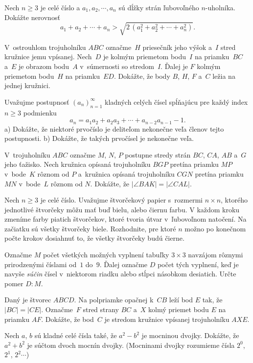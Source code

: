 {%
Nech $n\ge3$ je celé číslo a $a_1, a_2, \cdots, a_n$ sú dĺžky strán ľubovoľného $n$-uholníka. Dokážte nerovnosť
$$a_1 + a_2 + \cdots + a_n > \sqrt{2\,(a_1^2+a_2^2+\cdots+a_n^2)}.$$}

{%
V~ostrouhlom trojuholníku $ABC$ označme~$H$ priesečník jeho výšok a~$I$ stred kružnice jemu vpísanej. Nech~$D$ je kolmým priemetom bodu~$I$ na priamku~$BC$ a~$E$ je obrazom bodu~$A$ v~súmernosti so stredom~$I$. Ďalej je $F$ kolmým priemetom bodu~$H$ na priamku~$ED$. Dokážte, že body $B$, $H$, $F$ a~$C$ ležia na jednej kružnici.}

{%
Uvažujme postupnosť $(a_n)_{n=1}^\infty$ kladných celých čísel spĺňajúcu pre každý index $n\ge 3$ podmienku
$$
a_n=a_1a_2+a_2a_3+\cdots + a_{n-2}a_{n-1} - 1.
$$
\ite a) Dokážte, že niektoré prvočíslo je deliteľom nekonečne veľa členov tejto postupnosti.
\ite b) Dokážte, že takých prvočísel je nekonečne veľa.
}

{%
V~trojuholníku $ABC$ označme $M$, $N$, $P$ postupne stredy strán $BC$, $CA$, $AB$ a~$G$ jeho ťažisko. Nech kružnica opísaná trojuholníku $BGP$ pretína priamku $MP$ v~bode~$K$ rôznom od $P$ a~kružnica opísaná trojuholníku $CGN$ pretína priamku $MN$ v~bode~$L$ rôznom od $N$. Dokážte, že $|\angle BAK| = |\angle CAL|$.}

{%
Nech $n \geq 3$ je celé číslo. Uvažujme štvorčekový papier s~rozmermi $n \times n$, ktorého jednotlivé štvorčeky môžu mať buď bielu, alebo čiernu farbu. V každom kroku zmeníme farby piatich štvorčekov, ktoré tvoria útvar
v~ľubovoľnom natočení. Na začiatku sú všetky štvorčeky biele. Rozhodnite, pre ktoré $n$ možno po konečnom počte krokov dosiahnuť to, že všetky štvorčeky budú čierne.}

{%
Označme $M$ počet všetkých možných vyplnení tabuľky $3 \times 3$
navzájom rôznymi prirodzenými číslami od~$1$ do~$9$.
Ďalej označme $D$ počet tých vyplnení, keď je navyše \emph{súčin} čísel v~niektorom riadku alebo stĺpci násobkom desiatich.
Určte pomer $D : M$.}

{%
Daný je štvorec $ABCD$. Na polpriamke opačnej k~$CB$ leží bod $E$ tak, že $|BC|=|CE|$. Označme~$F$ stred strany $BC$ a~$X$ kolmý priemet bodu $E$ na priamku $AF$. Dokážte, že bod~$C$ je stredom kružnice vpísanej trojuholníku $AXE$.}

{%
Nech $a$, $b$ sú kladné celé čísla také, že $a^2-b^2$ je mocninou dvojky. Dokážte, že $a^2+b^2$ je súčtom dvoch mocnín dvojky. (Mocninami dvojky rozumieme čísla $2^0$, $2^1$, $2^2\cdots$)}

